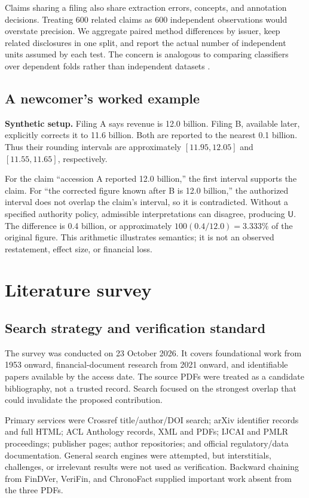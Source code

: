 \documentclass[11pt,a4paper]{article}
\newcommand{\pbreak}{\clearpage}
\newcommand{\lead}[1]{\textbf{\color{navy}#1}}
\newcommand{\Ulabel}{\mathsf{U}}
\begin{document}
Claims sharing a filing also share extraction errors, concepts, and annotation decisions. Treating 600 related claims as 600 independent observations would overstate precision. We aggregate paired method differences by issuer, keep related disclosures in one split, and report the actual number of independent units assumed by each test. The concern is analogous to comparing classifiers over dependent folds rather than independent datasets \cite{demsar,kapoor}.

\subsection{A newcomer’s worked example}
\lead{Synthetic setup.} Filing A says revenue is 12.0 billion. Filing B, available later, explicitly corrects it to 11.6 billion. Both are reported to the nearest 0.1 billion. Thus their rounding intervals are approximately \([11.95,12.05]\) and \([11.55,11.65]\), respectively.

For the claim “accession A reported 12.0 billion,” the first interval supports the claim. For “the corrected figure known after B is 12.0 billion,” the authorized interval does not overlap the claim's interval, so it is contradicted. Without a specified authority policy, admissible interpretations can disagree, producing \(\Ulabel\). The difference is 0.4 billion, or approximately \(100(0.4/12.0)=3.333\%\) of the original figure. This arithmetic illustrates semantics; it is not an observed restatement, effect size, or financial loss.

\pbreak
\section{Literature survey}
\subsection{Search strategy and verification standard}
The survey was conducted on 23 October 2026. It covers foundational work from 1953 onward, financial-document research from 2021 onward, and identifiable papers available by the access date. The source PDFs were treated as a candidate bibliography, not a trusted record. Search focused on the strongest overlap that could invalidate the proposed contribution.

Primary services were Crossref title/author/DOI search; arXiv identifier records and full HTML; ACL Anthology records, XML and PDFs; IJCAI and PMLR proceedings; publisher pages; author repositories; and official regulatory/data documentation. General search engines were attempted, but interstitials, challenges, or irrelevant results were not used as verification. Backward chaining from FinDVer, VeriFin, and ChronoFact supplied important work absent from the three PDFs.
\end{document}
